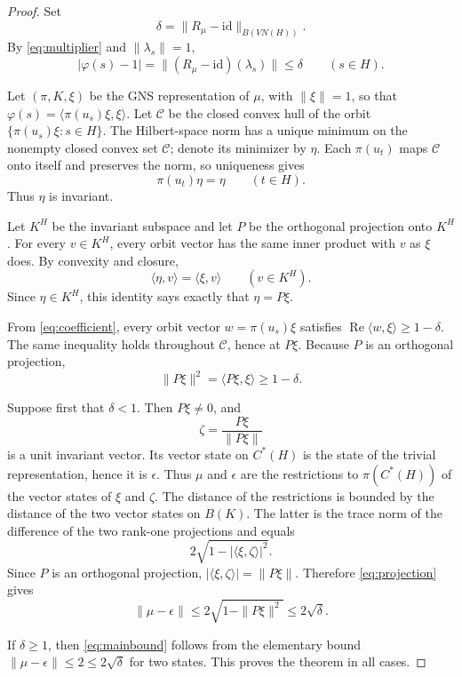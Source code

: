 \documentclass[11pt]{article}
\newcommand{\C}{\mathcal{C}}
\newcommand{\id}{\mathrm{id}}
\begin{document}
\begin{proof}
Set
\[
  \delta=\|R_\mu-\id\|_{B(VN(H))}.
\]
By \eqref{eq:multiplier} and $\|\lambda_s\|=1$,
\begin{equation}\label{eq:coefficient}
  |\varphi(s)-1|
  =\|(R_\mu-\id)(\lambda_s)\|
  \le\delta
  \qquad(s\in H).
\end{equation}

Let $(\pi,K,\xi)$ be the GNS representation of $\mu$, with $\|\xi\|=1$, so
that $\varphi(s)=\langle\pi(u_s)\xi,\xi\rangle$. Let $\C$ be the closed
convex hull of the orbit $\{\pi(u_s)\xi:s\in H\}$. The Hilbert-space norm has
a unique minimum on the nonempty closed convex set $\C$; denote its minimizer
by $\eta$. Each $\pi(u_t)$ maps $\C$ onto itself and preserves the norm, so
uniqueness gives
\[
  \pi(u_t)\eta=\eta \qquad(t\in H).
\]
Thus $\eta$ is invariant.

Let $K^H$ be the invariant subspace and let $P$ be the orthogonal projection
onto $K^H$. For every $v\in K^H$, every orbit vector has the same inner
product with $v$ as $\xi$ does. By convexity and closure,
\[
  \langle\eta,v\rangle=\langle\xi,v\rangle
  \qquad(v\in K^H).
\]
Since $\eta\in K^H$, this identity says exactly that $\eta=P\xi$.

From \eqref{eq:coefficient}, every orbit vector $w=\pi(u_s)\xi$ satisfies
$\operatorname{Re}\langle w,\xi\rangle\ge1-\delta$. The same inequality
holds throughout $\C$, hence at $P\xi$. Because $P$ is an orthogonal
projection,
\begin{equation}\label{eq:projection}
  \|P\xi\|^2=\langle P\xi,\xi\rangle\ge1-\delta.
\end{equation}

Suppose first that $\delta<1$. Then $P\xi\ne0$, and
\[
  \zeta=\frac{P\xi}{\|P\xi\|}
\]
is a unit invariant vector. Its vector state on $C^*(H)$ is the state of the
trivial representation, hence it is $\epsilon$. Thus $\mu$ and $\epsilon$
are the restrictions to $\pi(C^*(H))$ of the vector states of $\xi$ and
$\zeta$. The distance of the restrictions is bounded by the distance of the
two vector states on $B(K)$. The latter is the trace norm of the difference
of the two rank-one projections and equals
\[
  2\sqrt{1-|\langle\xi,\zeta\rangle|^2}.
\]
Since $P$ is an orthogonal projection,
$|\langle\xi,\zeta\rangle|=\|P\xi\|$. Therefore \eqref{eq:projection} gives
\[
  \|\mu-\epsilon\|
  \le 2\sqrt{1-\|P\xi\|^2}
  \le 2\sqrt\delta.
\]

If $\delta\ge1$, then \eqref{eq:mainbound} follows from the elementary bound
$\|\mu-\epsilon\|\le2\le2\sqrt\delta$ for two states. This proves the
theorem in all cases.
\end{proof}
\end{document}
